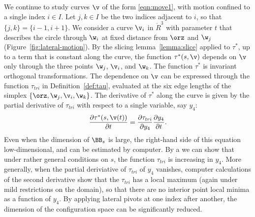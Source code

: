 \begin{remark}\label{rem:contract}
  We continue to study curves $\v$ of the form \eqref{eqn:move1}, with
  motion confined to a single index $i\in I$. Let $j,k\in I$ be the
  two indices adjacent to $i$, so that $\{j,k\}=\{i-1,i+1\}$.  We
  consider a curve $\v_i$ in $\ring{R}^3$ with parameter $t$ that
  describes the circle through $\w_i$ at fixed distance from $\orz$
  and $\w_j$ (Figure~\ref{fig:lateral-motion}).  By the slicing
  lemma~\ref{lemma:slice} applied to $\tau^*$, 
  up to a term that is constant along the
  curve, the function $\tau^*(s,\v)$ depends on $\v$ only through the
  three points $\w_j$, $\v_i$, and $\w_k$.  The function $\tau^*$ is
  invariant orthogonal transformations.  The dependence on $\v$ can be
  expressed through the function $\tau_{tri}$ in
  Definition~\ref{def:tau}, evaluated at the six edge lengths of the
  simplex $\{ \orz,\w_j,\v_i,\w_k \}$.  The derivative of $\tau^*$
  along the curve is given by the partial derivative of $\tau_{tri}$ with
  respect to a single variable, say $y_4$:
 \begin{equation}\label{eqn:tau-partial}
 \frac{\partial \tau^*(s,\v(t))}{\partial t} = \frac{\partial \tau_{tri}}{\partial y_4}
 \frac{\partial y_4}{\partial t}.
 \end{equation}  
 Even when the dimension of
  $\BB_s$ is large, the right-hand side of this equation low-dimensional,
  and can be estimated by computer.  By a  we can show that
  under rather general conditions on $s$, the function $\tau_{tri}$ is
  increasing in $y_4$.  More generally, when the partial deriviative
  of $\tau_{tri}$ of $y_4$ vanishes, computer calculations of the
  second derivative show that the $\tau_{tri}$ has a local maximum
  (again under mild restrictions on the domain), so that there are no
  interior point local minima as a function of $y_4$.  By applying lateral
  pivots at one index after another, the dimension of the configuration space
  can be significantly reduced.
\end{remark}

\figGJBTZJI %

